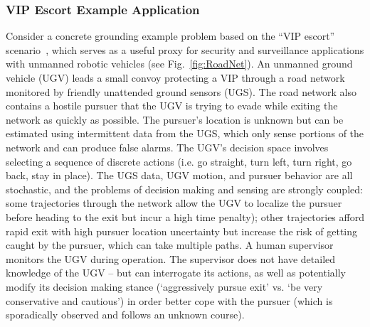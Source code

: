 \subsubsection{VIP Escort Example Application} \label{sec:vip_escort}
Consider a concrete grounding example problem based on the ``VIP escort'' scenario~\cite{Humphrey2012-lr}, which %
serves as a useful proxy for security and surveillance applications with unmanned robotic vehicles (see Fig.~\ref{fig:RoadNet}). An unmanned ground vehicle (UGV) leads a small convoy protecting a VIP through a road network monitored by friendly unattended ground sensors (UGS). The road network also contains a hostile pursuer that the UGV is trying to evade while exiting the network as quickly as possible. The pursuer's location is unknown but can be estimated using intermittent data from the UGS, which only sense portions of the network and can produce false alarms. The UGV's decision space involves selecting a sequence of discrete actions (i.e. go straight, turn left, turn right, go back, stay in place). The UGS data, UGV motion, and pursuer behavior are all stochastic, and the problems of decision making and sensing are strongly coupled: some trajectories through the network allow the UGV to localize the pursuer before heading to the exit but incur a high time penalty); other trajectories afford rapid exit with high pursuer location uncertainty but increase the risk of getting caught by the pursuer, which can take multiple paths. A human supervisor monitors the UGV during operation. The supervisor does not have detailed knowledge of the UGV -- but can interrogate its actions, as well as potentially modify its decision making stance (`aggressively pursue exit' vs. `be very conservative and cautious') %
in order better cope with the pursuer (which is sporadically observed and follows an unknown course). 


